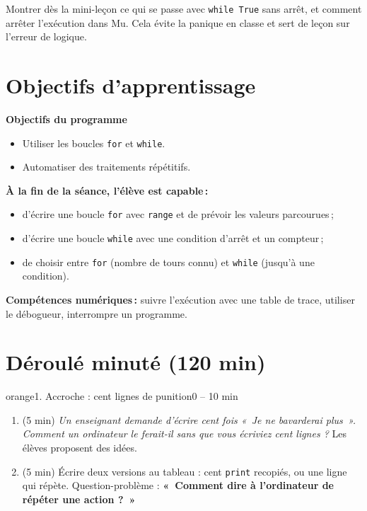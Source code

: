 \documentclass[11pt,a4paper]{article}
\begin{document}
\begin{astuce}
Montrer dès la mini-leçon ce qui se passe avec \texttt{while True} sans arrêt, et comment arrêter l'exécution dans Mu. Cela évite la panique en classe et sert de leçon sur l'erreur de logique.
\end{astuce}

\section{Objectifs d'apprentissage}
\begin{tcolorbox}[colback=gray!8,colframe=gray!60!black,arc=1mm,boxrule=0.5pt]
\textbf{Objectifs du programme}
\begin{itemize}
 \item Utiliser les boucles \texttt{for} et \texttt{while}.
 \item Automatiser des traitements répétitifs.
\end{itemize}
\textbf{À la fin de la séance, l'élève est capable\,:}
\begin{itemize}
 \item d'écrire une boucle \texttt{for} avec \texttt{range} et de prévoir les valeurs parcourues\,;
 \item d'écrire une boucle \texttt{while} avec une condition d'arrêt et un compteur\,;
 \item de choisir entre \texttt{for} (nombre de tours connu) et \texttt{while} (jusqu'à une condition).
\end{itemize}
\textbf{Compétences numériques\,:} suivre l'exécution avec une table de trace, utiliser le débogueur, interrompre un programme.
\end{tcolorbox}

\section{Déroulé minuté (120 min)}

\begin{etape}{orange}{1. Accroche : cent lignes de punition}{0 -- 10 min}
\begin{enumerate}
 \item (5 min) \emph{Un enseignant demande d'écrire cent fois «~Je ne bavarderai plus~». Comment un ordinateur le ferait-il sans que vous écriviez cent lignes ?} Les élèves proposent des idées.
 \item (5 min) Écrire deux versions au tableau : cent \texttt{print} recopiés, ou une ligne qui répète. Question-problème : \textbf{«~Comment dire à l'ordinateur de répéter une action ?~»}
\end{enumerate}
\end{etape}
\end{document}
